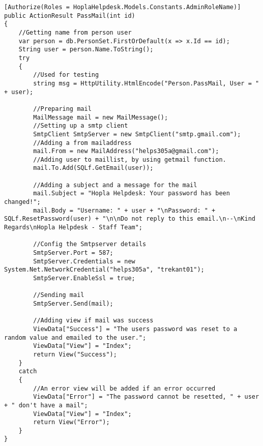 \begin{lstlisting}[style=sourceCode, caption=\myCaption{The PassMail(int id) method}, label=lst:passmail]
[Authorize(Roles = HoplaHelpdesk.Models.Constants.AdminRoleName)]
public ActionResult PassMail(int id)
{
    //Getting name from person user
    var person = db.PersonSet.FirstOrDefault(x => x.Id == id);
    String user = person.Name.ToString();
    try
    {
        //Used for testing
        string msg = HttpUtility.HtmlEncode("Person.PassMail, User = " + user);
            
        //Preparing mail
        MailMessage mail = new MailMessage();
        //Setting up a smtp client
        SmtpClient SmtpServer = new SmtpClient("smtp.gmail.com");
        //Adding a from mailaddress
        mail.From = new MailAddress("helps305a@gmail.com");
        //Adding user to maillist, by using getmail function.
        mail.To.Add(SQLf.GetEmail(user));

        //Adding a subject and a message for the mail
        mail.Subject = "Hopla Helpdesk: Your password has been changed!";
        mail.Body = "Username: " + user + "\nPassword: " + SQLf.ResetPassword(user) + "\n\nDo not reply to this email.\n--\nKind Regards\nHopla Helpdesk - Staff Team";

        //Config the Smtpserver details
        SmtpServer.Port = 587;
        SmtpServer.Credentials = new System.Net.NetworkCredential("helps305a", "trekant01");
        SmtpServer.EnableSsl = true;

        //Sending mail
        SmtpServer.Send(mail);

        //Adding view if mail was success
        ViewData["Success"] = "The users password was reset to a random value and emailed to the user.";
        ViewData["View"] = "Index";
        return View("Success");
    }
    catch
    {
        //An error view will be added if an error occurred
        ViewData["Error"] = "The password cannot be resetted, " + user + " don't have a mail";
        ViewData["View"] = "Index";
        return View("Error");
    }
}
\end{lstlisting}